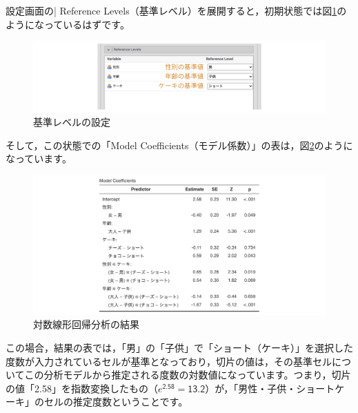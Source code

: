 \documentclass[
  12pt,
  a5jpaper,
  lualatex, ja=standard]{bxjsbook}
\begin{document}
設定画面の\colorbox{bar}{\textcolor{gmoji2}{| Reference Levels}}（基準レベル）を展開すると，初期状態では図\ref{fig:frequencies-loglin-referencelevels}のようになっているはずです。

\begin{figure}[!ht]

{\centering \includegraphics[width=1\linewidth]{images/frequencies/loglin-referencelevels} 

}

\caption{基準レベルの設定}\label{fig:frequencies-loglin-referencelevels}
\end{figure}

そして，この状態での「Model Coefficients（モデル係数）」の表は，図\ref{fig:frequencies-loglin-referencelevels-result1}のようになっています。

\begin{figure}[!ht]

{\centering \includegraphics[width=1\linewidth]{images/frequencies/loglin-referencelevels-result1} 

}

\caption{対数線形回帰分析の結果}\label{fig:frequencies-loglin-referencelevels-result1}
\end{figure}

この場合，結果の表では，「男」の「子供」で「ショート（ケーキ）」を選択した度数が入力されているセルが基準となっており，切片の値は，その基準セルについてこの分析モデルから推定される度数の対数値になっています。つまり，切片の値「2.58」を指数変換したもの（\(e^{\textsf{2.58}}=\textsf{13.2}\)）が，「男性・子供・ショートケーキ」のセルの推定度数ということです。
\end{document}
